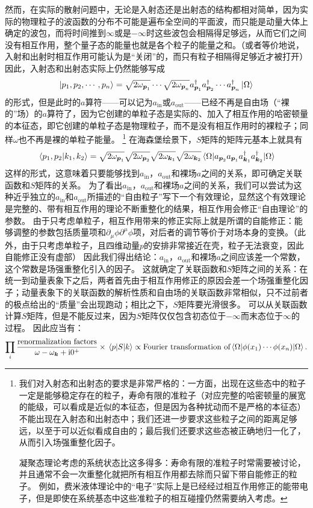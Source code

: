 \documentclass[hyperref, UTF8, a4paper]{ctexart}
\newcommand*{\ii}{\mathrm{i}}
\begin{document}
然而，在实际的散射问题中，无论是入射态还是出射态的结构都相对简单，因为实际的物理粒子的波函数的分布不可能是遍布全空间的平面波，而只能是动量大体上确定的波包，而将时间推到$\infty$或是$-\infty$时这些波包会相隔得足够远，从而它们之间没有相互作用，整个量子态的能量也就是各个粒子的能量之和。（或者等价地说，入射和出射时相互作用可能认为是“关闭”的，而只有粒子相隔得足够近才被打开）
因此，入射态和出射态实际上仍然能够写成
\[
    \ket{p_1, p_2, \cdots, p_n} = \sqrt{2\omega_{\vb*{p}_1}} \cdots \sqrt{2\omega_{\vb*{p}_n}} a^\dagger_{\vb*{p}_1} a^\dagger_{\vb*{p}_2} \cdots a^\dagger_{\vb*{p}_n} \ket{\Omega}
\]
的形式，但是此时的$a$算符——可以记为$a_\text{in}$或$a_\text{out}$——已经不再是自由场（“裸的”场）的$a$算符了，因为它创建的单粒子态是实际的、加入了相互作用的哈密顿量的本征态，即它创建的单粒子态是物理粒子，而不是没有相互作用时的裸粒子；同样$\omega$也不再是裸的单粒子能量。%
\footnote{
    我们对入射态和出射态的要求是非常严格的：一方面，出现在这些态中的粒子一定是能够稳定存在的粒子，寿命有限的准粒子（对应完整的哈密顿量的展宽的能级，可以看成是近似的本征态，但是因为各种扰动而不是严格的本征态）不能出现在入射态和出射态中；我们还进一步要求这些粒子之间的距离足够远，以至于可以近似看成自由的；最后我们还要求这些态被正确地归一化了，从而引入场强重整化因子。

    凝聚态理论考虑的系统状态比这多得多：寿命有限的准粒子时常需要被讨论，并且通常不会一次重整化就把所有相互作用都去除而只留下带自能修正的粒子。
    例如，费米液体理论中的“电子”实际上是已经经过相互作用修正的能带电子，但是即使在系统基态中这些准粒子的相互碰撞仍然需要纳入考虑。
}%
在海森堡绘景下，$S$矩阵的矩阵元基本上就具有
\[
    \braket*{p_1, p_2}{k_1, k_2} = \sqrt{2\omega_{\vb*{p}_1}} \sqrt{2\omega_{\vb*{p}_2}} \sqrt{2\omega_{\vb*{k}_1}} \sqrt{2\omega_{\vb*{k}_2}} \mel*{\Omega}{a_{\vb*{p}_2} a_{\vb*{p}_1} a^\dagger_{\vb*{k}_1} a^\dagger_{\vb*{k}_2}}{\Omega}
\]
这样的形式，这意味着只要能够找到$a_\text{in}$，$a_\text{out}$和裸场$a$之间的关系，即可确定关联函数和$S$矩阵的关系。
为了看出$a_\text{in}$，$a_\text{out}$和裸场$a$之间的关系，我们可以尝试为这种近乎独立的$a_\text{in}$和$a_\text{out}$所描述的“自由粒子”写下一个有效理论，显然这个有效理论是完整的、带有相互作用的理论不断重整化的结果，相互作用会修正“自由理论”的参数。
由于只考虑单粒子，相互作用带来的修正实际上就是所谓的自能修正：能够调整的参数包括质量项和$\partial_\mu \phi \partial^\mu \phi$项，对后者的调节等价于对场本身的变换。（此外，由于只考虑单粒子，且四维动量$p$的安排非常接近在壳，粒子无法衰变，因此自能修正没有虚部）
因此我们得出结论：$a_\text{in}$，$a_\text{out}$和裸场$a$之间应该差一个常数，这个常数是场强重整化引入的因子。
这就确定了关联函数和$S$矩阵之间的关系：在统一到动量表象下之后，两者首先由于相互作用修正的原因会差一个场强重整化因子；动量表象下的关联函数的解析性质和自由场的关联函数非常相似，只不过前者的极点给出的“质量”会出现跑动；相比之下，$S$矩阵要光滑很多。
可以从关联函数计算$S$矩阵，但是不能反过来，因为$S$矩阵仅仅包含初态位于$-\infty$而末态位于$\infty$的过程。
因此应当有：
\[
    \prod_{i} \frac{\text{renormalization factors}}{\omega - \omega_{\vb*{k}} + \ii 0^+} \times \mel*{p}{S}{k} \propto \text{Fourier transformation of} \mel*{\Omega}{\phi(x_1) \cdots \phi(x_n)}{\Omega}.
\]
\end{document}
